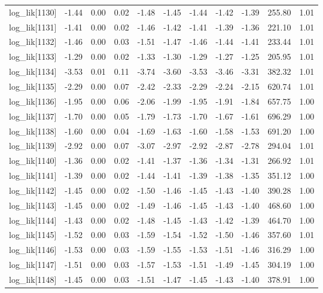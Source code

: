\begin{table}[ht]
\begin{tabular}{rrrrrrrrrrr}
  log\_lik[1130] & -1.44 & 0.00 & 0.02 & -1.48 & -1.45 & -1.44 & -1.42 & -1.39 & 255.80 & 1.01 \\ 
  log\_lik[1131] & -1.41 & 0.00 & 0.02 & -1.46 & -1.42 & -1.41 & -1.39 & -1.36 & 221.10 & 1.01 \\ 
  log\_lik[1132] & -1.46 & 0.00 & 0.03 & -1.51 & -1.47 & -1.46 & -1.44 & -1.41 & 233.44 & 1.01 \\ 
  log\_lik[1133] & -1.29 & 0.00 & 0.02 & -1.33 & -1.30 & -1.29 & -1.27 & -1.25 & 205.95 & 1.01 \\ 
  log\_lik[1134] & -3.53 & 0.01 & 0.11 & -3.74 & -3.60 & -3.53 & -3.46 & -3.31 & 382.32 & 1.01 \\ 
  log\_lik[1135] & -2.29 & 0.00 & 0.07 & -2.42 & -2.33 & -2.29 & -2.24 & -2.15 & 620.74 & 1.01 \\ 
  log\_lik[1136] & -1.95 & 0.00 & 0.06 & -2.06 & -1.99 & -1.95 & -1.91 & -1.84 & 657.75 & 1.00 \\ 
  log\_lik[1137] & -1.70 & 0.00 & 0.05 & -1.79 & -1.73 & -1.70 & -1.67 & -1.61 & 696.29 & 1.00 \\ 
  log\_lik[1138] & -1.60 & 0.00 & 0.04 & -1.69 & -1.63 & -1.60 & -1.58 & -1.53 & 691.20 & 1.00 \\ 
  log\_lik[1139] & -2.92 & 0.00 & 0.07 & -3.07 & -2.97 & -2.92 & -2.87 & -2.78 & 294.04 & 1.01 \\ 
  log\_lik[1140] & -1.36 & 0.00 & 0.02 & -1.41 & -1.37 & -1.36 & -1.34 & -1.31 & 266.92 & 1.01 \\ 
  log\_lik[1141] & -1.39 & 0.00 & 0.02 & -1.44 & -1.41 & -1.39 & -1.38 & -1.35 & 351.12 & 1.00 \\ 
  log\_lik[1142] & -1.45 & 0.00 & 0.02 & -1.50 & -1.46 & -1.45 & -1.43 & -1.40 & 390.28 & 1.00 \\ 
  log\_lik[1143] & -1.45 & 0.00 & 0.02 & -1.49 & -1.46 & -1.45 & -1.43 & -1.40 & 468.60 & 1.00 \\ 
  log\_lik[1144] & -1.43 & 0.00 & 0.02 & -1.48 & -1.45 & -1.43 & -1.42 & -1.39 & 464.70 & 1.00 \\ 
  log\_lik[1145] & -1.52 & 0.00 & 0.03 & -1.59 & -1.54 & -1.52 & -1.50 & -1.46 & 357.60 & 1.01 \\ 
  log\_lik[1146] & -1.53 & 0.00 & 0.03 & -1.59 & -1.55 & -1.53 & -1.51 & -1.46 & 316.29 & 1.00 \\ 
  log\_lik[1147] & -1.51 & 0.00 & 0.03 & -1.57 & -1.53 & -1.51 & -1.49 & -1.45 & 304.19 & 1.00 \\ 
  log\_lik[1148] & -1.45 & 0.00 & 0.03 & -1.51 & -1.47 & -1.45 & -1.43 & -1.40 & 378.91 & 1.00 \\ 

\end{tabular}
\end{table}
